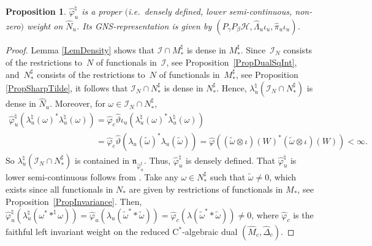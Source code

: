 \documentclass[pdftex]{sigma}
\numberwithin{equation}{section}
\newtheorem{prop}[thm]{Proposition}
\theoremstyle{definition}
\newcommand{\cHil}{\mathcal{H}}
\begin{document}
\begin{prop}\label{PropNSFWeightCast}
$\hat{\varphi}_u^\natural $ is a proper $($i.e.\ densely defined, lower semi-continuous, non-zero$)$ weight on $\hat{N}_u$. Its GNS-representation is given by  $(P_\gamma P_\beta \cHil, \hat{\Lambda}_{u}  \iota_u, \hat{\pi}_{u}  \iota_u )$.
\end{prop}
\begin{proof}
Lemma \ref{LemDensity} shows that  $\mathcal{I} \cap M_\ast^\sharp$ is dense in $M_\ast^\sharp$.
Since~$\mathcal{I}_N$ consists of the restrictions to~$N$ of functionals in~$\mathcal{I}$, see Proposition~\ref{PropDualSqInt}, and~$N_\ast^\sharp$ consists of the restrictions to~$N$ of functionals in~$M_\ast^\sharp$, see Proposition \ref{PropSharpTilde}, it follows that $\mathcal{I}_N \cap N_\ast^\sharp$ is dense in $N_\ast^\sharp$. Hence, $\lambda_u^\natural(\mathcal{I}_N \cap N_\ast^\sharp)$ is dense in $\hat{N}_u$. Moreover, for $\omega \in \mathcal{I}_N \cap N_\ast^\sharp$,
\begin{gather*}
 \hat{\varphi}^\natural_u(\lambda_u^\natural(\omega)^\ast\lambda_u^\natural(\omega) ) = \hat{\varphi}_c \hat{\vartheta} \iota_u (\lambda_u^\natural(\omega)^\ast\lambda_u^\natural(\omega) )
\\
\phantom{\hat{\varphi}^\natural_u(\lambda_u^\natural(\omega)^\ast\lambda_u^\natural(\omega) )}{}
=  \hat{\varphi}_c \hat{\vartheta} (\lambda_u(\tilde{\omega})^\ast\lambda_u(\tilde{\omega}) ) = \hat{\varphi}( (\tilde{\omega} \otimes \iota)(W)^\ast (\tilde{\omega} \otimes \iota)(W) )
< \infty .
\end{gather*}
So   $\lambda_u^\natural(\mathcal{I}_N \cap N_\ast^\sharp)$ is contained in $\mathfrak{n}_{\hat{\varphi}_u^\natural}$. Thus, $\hat{\varphi}^\natural_u$ is densely def\/ined.
 That $\hat{\varphi}_u^\natural $ is lower semi-continuous follows from \cite[Def\/inition~1.5]{KusVae}. Take any $\omega \in N_\ast^\sharp$ such that $\tilde{\omega} \not = 0$, which exists since all functionals in $N_\ast$ are given by restrictions of functionals in $M_\ast$, see Proposition~\ref{PropInvariance}. Then, $\hat{\varphi}_u^\natural ( \lambda_u^\natural( \omega^\ast \ast^\natural \omega) ) = \hat{\varphi}_u( \lambda_u (\tilde{\omega}^\ast \ast \tilde{\omega}) ) = \hat{\varphi}_c(\lambda(\tilde{\omega}^\ast \ast \tilde{\omega})) \not = 0 $, where $\hat{\varphi}_c$ is the faithful left invariant weight on the reduced C$^\ast$-algebraic dual $(\hat{M}_c, \hat{\Delta}_c)$.


\end{proof}
\end{document}
